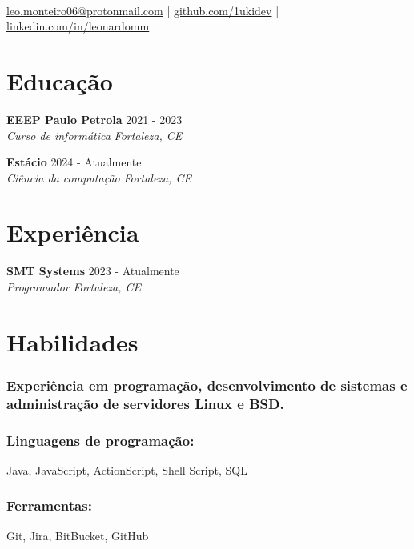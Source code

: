 \documentclass{article}
\author{Leonardo M. Moreira}
\makeatletter
\renewcommand{\maketitle}{
    \begin{center}
        {\huge\bfseries\theauthor} \\
        \href{mailto:leo.monteiro06@protonmail.com}{leo.monteiro06@protonmail.com} |
        \href{https://github.com/1ukidev}{github.com/1ukidev} |
        \href{https://www.linkedin.com/in/leonardomm}{linkedin.com/in/leonardomm}
    \end{center}
}
\newenvironment{rSubsection2}[4]{
 {\bf #1} \hfill {#2}
 \\
 {\em #3} \hfill {\em #4} {\parfillskip0pt\par}
 \vspace{0.5em}
}
\makeatother
\begin{document}
\maketitle

\section{Educação}
    \begin{rSubsection2}
        {EEEP Paulo Petrola}{2021 - 2023}{Curso de informática}{Fortaleza, CE}
    \end{rSubsection2}
    \begin{rSubsection2}
        {Estácio}{2024 - Atualmente}{Ciência da computação}{Fortaleza, CE}
    \end{rSubsection2}
\vspace{-1em}

\section{Experiência}
    \begin{rSubsection2}
        {SMT Systems}{2023 - Atualmente}{Programador}{Fortaleza, CE}
    \end{rSubsection2}
\vspace{-1em}

\section{Habilidades}
    \subsubsection
    {Experiência em programação, desenvolvimento de sistemas e administração de servidores Linux e BSD.}
    \hfill
    \vspace{-1em}

    \subsubsection
    {Linguagens de programação:}
    Java, JavaScript, ActionScript, Shell Script, SQL 
    \vspace{-1.5em}

    \subsubsection
    {Ferramentas:}
    Git, Jira, BitBucket, GitHub
    \vspace{-1.5em}
\end{document}
